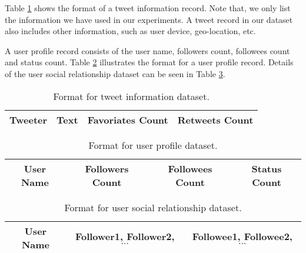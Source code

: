 Table \ref{tab:tweet information} shows the format of a tweet information record. Note that, we only list the information we have used in our experiments. A tweet record in our dataset also includes other information, such as user device, geo-location, etc. 

A user profile record consists of the user name, followers count, followees count and status count. Table \ref{tab:user profile} illustrates the format for a user profile record. Details of the user social relationship dataset can be seen in Table \ref{tab:social relationship}.

\begin{table}[htpb]
\centering
\begin{tabular}{|c|c|c|c|}
\hline
Tweeter  & Text  & Favoriates Count & Retweets Count \\
\hline
\end{tabular}
\caption{Format for tweet information dataset.}
\label{tab:tweet information}
\end{table}

\begin{table}[htpb]
\centering
\begin{tabular}{|c|c|c|c|}
\hline
User Name & Followers Count & Followees Count & Status Count \\
\hline
\end{tabular}
\caption{Format for user profile dataset.}
\label{tab:user profile}
\end{table}

\begin{table}[htpb]
\centering
\begin{tabular}{|c|c|c|}
\hline
User Name & Follower1, Follower2, $\cdots$ & Followee1, Followee2, $\cdots$ \\
\hline
\end{tabular}
\caption{Format for user social relationship dataset.}
\label{tab:social relationship}
\end{table}